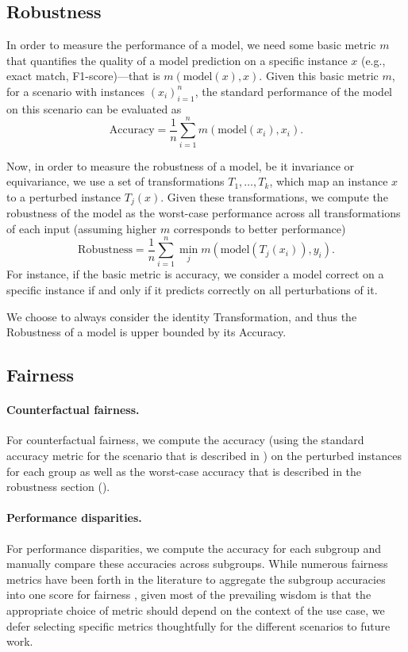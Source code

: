 \subsection{Robustness}
\label{app:metrics-robustness}
In order to measure the performance of a model, we need some basic metric $m$ that quantifies the quality of a model prediction on a specific instance $x$ (e.g., exact match, F1-score)---that is $m(\text{model}(x),x)$.
Given this basic metric $m$, for a scenario with instances $(x_i)_{i=1}^n$, the standard performance of the model on this scenario can be evaluated as
$$\text{Accuracy}= \frac{1}{n}\sum_{i=1}^n m(\text{model}(x_i), x_i).$$

Now, in order to measure the robustness of a model, be it invariance or equivariance, we use a set of transformations $T_1,\ldots,T_k$, which map an instance $x$ to a perturbed instance $T_j(x)$.
Given these transformations, we compute the robustness of the model as the worst-case performance across all transformations of each input (assuming higher $m$ corresponds to better performance)
$$\text{Robustness} = \frac{1}{n}\sum_{i=1}^n \min_j m(\text{model}(T_j(x_i)), y_i).$$
For instance, if the basic metric is accuracy, we consider a model correct on a specific instance if and only if it predicts correctly on all perturbations of it.

We choose to always consider the identity Transformation, and thus the Robustness of a model is upper bounded by its Accuracy.

\subsection{Fairness}
\label{app:metrics-fairness}

\paragraph{Counterfactual fairness.}
For counterfactual fairness, we compute the accuracy (using the standard accuracy metric for the scenario that is described in ) on the perturbed instances for each group as well as the worst-case accuracy that is described in the robustness section (). 

\paragraph{Performance disparities.}
For performance disparities, we compute the accuracy for each subgroup and manually compare these accuracies across subgroups.
While numerous fairness metrics have been forth in the literature to aggregate the subgroup accuracies into one score for fairness \citep[\eg][]{narayanan2018fairness}, given most of the prevailing wisdom is that the appropriate choice of metric should depend on the context of the use case, we defer selecting specific metrics thoughtfully for the different scenarios to future work. 

